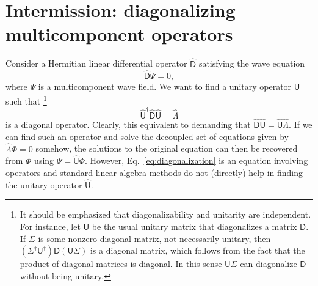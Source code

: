\section{Intermission: diagonalizing multicomponent operators}

Consider a Hermitian linear differential operator $\widehat{\mathsf{D}}$ satisfying the wave equation
%
\begin{equation}
  \widehat{\mathsf{D}}\Psi = 0,
\end{equation}
%
where $\Psi$ is a multicomponent wave field.
%
We want to find a unitary operator ${\mathsf{U}}$ such that%
\footnote{It should be emphasized that diagonalizability and unitarity are independent. For instance, let $\mathsf{U}$ be the usual unitary matrix that diagonalizes a matrix $\mathsf{D}$.
  If $\Sigma$ is some nonzero diagonal matrix, not necessarily unitary, then $(\Sigma^{\dagger}\mathsf{U}^{\dagger})\mathsf{D}(\mathsf{U}\Sigma)$ is a diagonal matrix, which follows from the fact that the product of diagonal matrices is diagonal.
  In this sense $\mathsf{U}\Sigma$ can diagonalize $\mathsf{D}$ without being unitary.}
%
\begin{equation}
  \widehat{\mathsf{U}}^{\dagger}\widehat{\mathsf{D}}\widehat{\mathsf{U}} = \hat{\Lambda}\label{eq:diagonalization}
\end{equation}
%
is a diagonal operator.
Clearly, this equivalent to demanding that $\widehat{\mathsf{D}}\widehat{\mathsf{U}} = \widehat{\mathsf{U}}\hat{\Lambda}$.
If we can find such an operator and solve the decoupled set of equations given by $\hat{\Lambda}\Phi = 0$ somehow,
the solutions to the original equation can then be recovered from $\Phi$ using $\Psi = \widehat{\mathsf{U}}\Phi$.
However, Eq.~\eqref{eq:diagonalization} is an equation involving operators and standard linear algebra methods do not (directly) help in finding the unitary operator $\widehat{\mathsf{U}}$.

